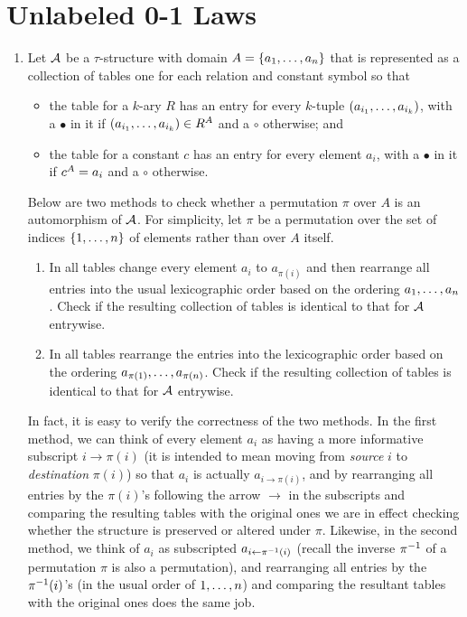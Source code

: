\section{Unlabeled 0-1 Laws}
\begin{enumerate}[1.]
%
\item {} Let $\mathcal{A}$ be a $\tau$-structure with domain $A = {\{a_1, \ldots, a_n\}}$ that is represented as a collection of tables one for each relation and constant symbol so that
\begin{itemize}
\item the table for a $k$-ary $R$ has an entry for every $k$-tuple $(a_{i_1}, \ldots, a_{i_k})$, with a $\bullet$ in it if $(a_{i_1}, \ldots, a_{i_k}) \in R^{A}$ and a $\circ$ otherwise; and
\item the table for a constant $c$ has an entry for every element $a_i$, with a $\bullet$ in it if $c^{A} = a_i$ and a $\circ$ otherwise.
\end{itemize}
Below are two methods to check whether a permutation $\pi$ over $A$ is an automorphism of $\mathcal{A}$. For simplicity, let $\pi$ be a permutation over the set of indices ${\{1, \ldots, n\}}$ of elements rather than over $A$ itself.
\begin{enumerate}[(1)]
\item In all tables change every element $a_i$ to $a_{\pi(i)}$ and then rearrange all entries into the usual lexicographic order based on the ordering $a_1, \ldots, a_n$. Check if the resulting collection of tables is identical to that for $\mathcal{A}$ entrywise.
\item In all tables rearrange the entries into the lexicographic order based on the ordering $a_{\pi(1)}, \ldots, a_{\pi(n)}$. Check if the resulting collection of tables is identical to that for $\mathcal{A}$ entrywise.
\end{enumerate}
In fact, it is easy to verify the correctness of the two methods. In the first method, we can think of every element $a_i$ as having a more informative subscript $i \to \pi(i)$ (it is intended to mean moving from \emph{source} $i$ to \emph{destination} $\pi(i)$) so that $a_i$ is actually $a_{i \to \pi(i)}$, and by rearranging all entries by the $\pi(i)$'s following the arrow $\to$ in the subscripts and comparing the resulting tables with the original ones we are in effect checking whether the structure is preserved or altered under $\pi$. Likewise, in the second method, we think of $a_i$ as subscripted $a_{i \leftarrow \pi^{-1}(i)}$ (recall the inverse $\pi^{-1}$ of a permutation $\pi$ is also a permutation), and rearranging all entries by the $\pi^{-1}(i)$'s (in the usual order of $1, \ldots, n$) and comparing the resultant tables with the original ones does the same job.

\end{enumerate}

